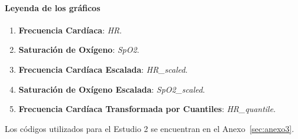\paragraph{Leyenda de los gráficos}

\begin{enumerate}
    \item \textbf{Frecuencia Cardíaca}: \textit{HR}.
    \item \textbf{Saturación de Oxígeno}: \textit{SpO2}.
    \item \textbf{Frecuencia Cardíaca Escalada}: \textit{HR\_scaled}.
    \item \textbf{Saturación de Oxígeno Escalada}: \textit{SpO2\_scaled}.
    \item \textbf{Frecuencia Cardíaca Transformada por Cuantiles}: \textit{HR\_quantile}.
\end{enumerate}

\newpage


\newpage


\newpage


\newpage


\newpage


\newpage


\vspace{10pt}
Los códigos utilizados para el Estudio 2 se encuentran en el Anexo~\ref{sec:anexo3}.